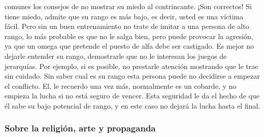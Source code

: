comunes los consejos de no mostrar su miedo al contrincante. ¡Son
correctos! Si tiene miedo, admite que su rango es más bajo, es decir,
usted es una víctima fácil. Pero sin un buen entrenamiento no trate de
imitar a una persona de alto rango, lo más probable es que no le salga
bien, pero puede provocar la agresión, ya que un omega que pretende el
puesto de alfa debe ser castigado. Es mejor no dejarle entender su
rango, demostrarle que no le interesan los juegos de jerarquías. Por
ejemplo, si es posible, no prestarle atención mostrando que le trae sin
cuidado. Sin saber cual es su rango esta persona puede no decidirse a
empezar el conflicto. El, le recuerdo una vez más, normalmente es un
cobarde, y no empieza la lucha si no está seguro de vencer. Esta
seguridad le da el hecho de que él sabe su bajo potencial de rango, y en
este caso no dejará la lucha hasta el final.

\protect\hypertarget{M25}{}{}

\hypertarget{sobre-la-religiuxf3n-arte-y-propaganda}{\subsubsection{Sobre
la religión, arte y
propaganda}\label{sobre-la-religiuxf3n-arte-y-propaganda}}


